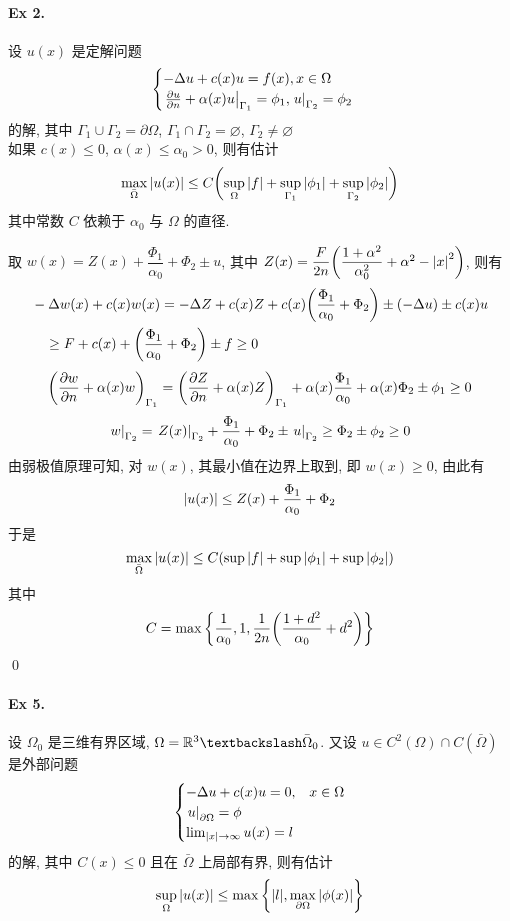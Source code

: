\paragraph{Ex 2.}
设 $u(x)$ 是定解问题
\[ \begin{cases}
-\Delta u + c(x) u = f(x), x \in \Omega \\
{\left.{{\frac{\partial {u}}{\partial {n}}} + \alpha(x)u} \right|}_{\Gamma_1} = \phi_1,
{\left.{u} \right|}_{\Gamma_2} = \phi_2
\end{cases} \]
的解, 其中 $\Gamma_1 \cup \Gamma_2 = \partial\Omega$,
$\Gamma_1 \cap \Gamma_2 = \varnothing$, $\Gamma_2 \neq \varnothing$ \\
如果 $c(x) \leq 0$, $\alpha(x) \leq \alpha_0 > 0$, 则有估计
\[ \max_{\bar\Omega} {\lvert {u(x)} \rvert} \leq C{\left( {
    \sup_{\Omega}{\lvert {f} \rvert}+\sup_{\Gamma_1}{\lvert {\phi_1} \rvert}+\sup_{\Gamma_2}{\lvert {\phi_2} \rvert}
} \right)} \]
其中常数 $C$ 依赖于 $\alpha_0$ 与 $\Omega$ 的直径.

\begin{solution}
取 $w(x) = Z(x) + \dfrac{\Phi_1}{\alpha_0} + \Phi_2 \pm u$, 其中
$Z(x)=\dfrac F{2n}{\left( {\dfrac{1+\alpha^2}{\alpha_0^2}+\alpha^2-{\lvert {x} \rvert}^2} \right)}$,
则有 
\[ \begin{aligned}
&-\Delta w(x) + c(x)w(x) = -\Delta Z+c(x)Z+c(x){\left( {
    \dfrac{\Phi_1}{\alpha_0} + \Phi_2
} \right)} \pm (-\Delta u) \pm c(x)u \\
&\quad \geq F + c(x) + {\left( {
    \dfrac{\Phi_1}{\alpha_0} + \Phi_2
} \right)} \pm f \geq 0
\end{aligned} \]
\[
{\left( {{\frac{\partial {w}}{\partial {n}}}+\alpha(x)w} \right)}_{\Gamma_1}
={\left( {{\frac{\partial {Z}}{\partial {n}}}+\alpha(x)Z} \right)}_{\Gamma_1}
+\alpha(x)\frac{\Phi_1}{\alpha_0} + \alpha(x)\Phi_2 \pm \phi_1 \geq 0
\]
\[
{\left.{w} \right|}_{\Gamma_2}={\left.{Z(x)} \right|}_{\Gamma_2}+\frac{\Phi_1}{\alpha_0}+\Phi_2
\pm {\left.{u} \right|}_{\Gamma_2} \geq \Phi_2 \pm \phi_2 \geq 0
\]
由弱极值原理可知, 对 $w(x)$, 其最小值在边界上取到, 即 $w(x) \geq 0$, 由此有
\[{\lvert {u(x)} \rvert} \leq Z(x) + \frac{\Phi_1}{\alpha_0} + \Phi_2\]
于是
\[\max_{\bar\Omega} {\lvert {u(x)} \rvert} \leq C{\left( {
    \sup{\lvert {f} \rvert}+\sup{\lvert {\phi_1} \rvert}+\sup{\lvert {\phi_2} \rvert}
} \right)} \]
其中
\[ C = \max{\left\{ {
    \frac 1{\alpha_0}, 1, \frac 1{2n}{\left( {\frac{1+d^2}{\alpha_0} + d^2} \right)}
} \right\}} \]
\qed
\end{solution}


\paragraph{Ex 5.}
设 $\Omega_0$ 是三维有界区域, $\Omega = \mreal^3\textbackslash\bar\Omega_0$. 又设
$u \in C^2(\Omega) \cap C(\bar\Omega)$ 是外部问题
\[ \begin{cases}
-\Delta u + c(x) u = 0, & x \in \Omega \\
{\left.{u} \right|}_{\partial\Omega} = \phi \\
\lim_{{\lvert {x} \rvert} \to \infty} u(x) = l
\end{cases} \]
的解, 其中 $C(x) \leq 0$ 且在 $\bar\Omega$ 上局部有界, 则有估计
\[ \sup_{\Omega} {\lvert {u(x)} \rvert} \leq \max {\left\{ {
    {\lvert {l} \rvert}, \max_{\partial\Omega} {\lvert {\phi(x)} \rvert}
} \right\}} \]

